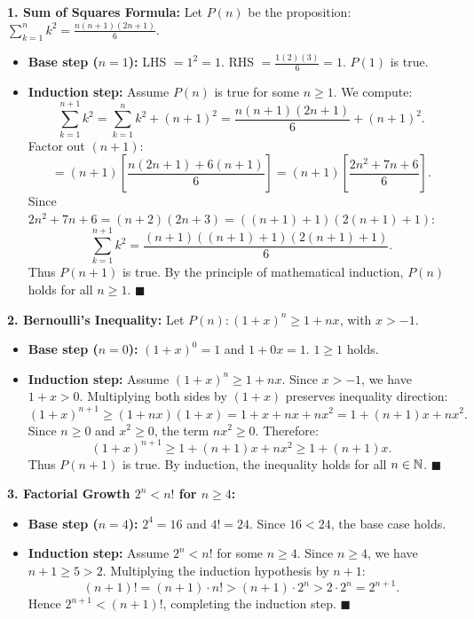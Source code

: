 \begin{solution}
\textbf{1. Sum of Squares Formula:}
Let $P(n)$ be the proposition: $\sum_{k=1}^n k^2 = \frac{n(n+1)(2n+1)}{6}$.
\begin{itemize}[leftmargin=1.5em,itemsep=2pt]
  \item \textbf{Base step ($n = 1$):} LHS $= 1^2 = 1$. RHS $= \frac{1(2)(3)}{6} = 1$. $P(1)$ is true.
  \item \textbf{Induction step:} Assume $P(n)$ is true for some $n \ge 1$. We compute:
  \[
  \sum_{k=1}^{n+1} k^2 = \sum_{k=1}^n k^2 + (n+1)^2 = \frac{n(n+1)(2n+1)}{6} + (n+1)^2.
  \]
  Factor out $(n+1)$:
  \[
  = (n+1)\left[\frac{n(2n+1) + 6(n+1)}{6}\right] = (n+1)\left[\frac{2n^2 + 7n + 6}{6}\right].
  \]
  Since $2n^2 + 7n + 6 = (n+2)(2n+3) = ((n+1)+1)(2(n+1)+1)$:
  \[
  \sum_{k=1}^{n+1} k^2 = \frac{(n+1)((n+1)+1)(2(n+1)+1)}{6}.
  \]
  Thus $P(n+1)$ is true. By the principle of mathematical induction, $P(n)$ holds for all $n \ge 1$. \hfill $\blacksquare$
\end{itemize}

\textbf{2. Bernoulli's Inequality:}
Let $P(n): (1+x)^n \ge 1 + nx$, with $x > -1$.
\begin{itemize}[leftmargin=1.5em,itemsep=2pt]
  \item \textbf{Base step ($n=0$):} $(1+x)^0 = 1$ and $1 + 0x = 1$. $1 \ge 1$ holds.
  \item \textbf{Induction step:} Assume $(1+x)^n \ge 1+nx$. Since $x > -1$, we have $1+x > 0$. Multiplying both sides by $(1+x)$ preserves inequality direction:
  \[
  (1+x)^{n+1} \ge (1+nx)(1+x) = 1 + x + nx + nx^2 = 1 + (n+1)x + nx^2.
  \]
  Since $n \ge 0$ and $x^2 \ge 0$, the term $nx^2 \ge 0$. Therefore:
  \[
  (1+x)^{n+1} \ge 1 + (n+1)x + nx^2 \ge 1 + (n+1)x.
  \]
  Thus $P(n+1)$ is true. By induction, the inequality holds for all $n \in \mathbb{N}$. \hfill $\blacksquare$
\end{itemize}

\textbf{3. Factorial Growth $2^n < n!$ for $n \ge 4$:}
\begin{itemize}[leftmargin=1.5em,itemsep=2pt]
  \item \textbf{Base step ($n=4$):} $2^4 = 16$ and $4! = 24$. Since $16 < 24$, the base case holds.
  \item \textbf{Induction step:} Assume $2^n < n!$ for some $n \ge 4$.
  Since $n \ge 4$, we have $n + 1 \ge 5 > 2$. Multiplying the induction hypothesis by $n+1$:
  \[
  (n+1)! = (n+1) \cdot n! > (n+1) \cdot 2^n > 2 \cdot 2^n = 2^{n+1}.
  \]
  Hence $2^{n+1} < (n+1)!$, completing the induction step. \hfill $\blacksquare$
\end{itemize}
\end{solution}

